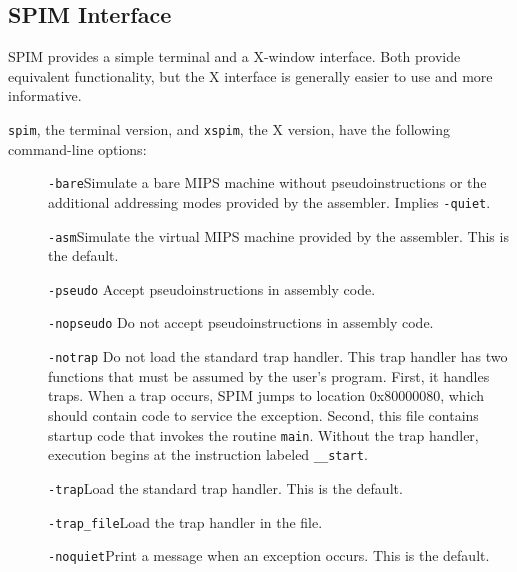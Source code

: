 \subsection{SPIM Interface}

SPIM provides a simple terminal and a X-window interface.  Both
provide equivalent functionality, but the X interface is generally
easier to use and more informative.

{\tt spim}, the terminal version, and {\tt xspim}, the X version, have
the following command-line options:
\begin{description}
  \item [] {\tt -bare}\newline Simulate a bare MIPS machine without
pseudoinstructions or the additional addressing modes provided by the
assembler.  Implies {\tt -quiet}.

  \item [] {\tt -asm}\newline Simulate the virtual MIPS machine
provided by the assembler.  This is the default.

  \item [] {\tt -pseudo} \newline Accept pseudoinstructions in assembly
code. 

  \item [] {\tt -nopseudo} \newline Do not accept pseudoinstructions in
assembly code. 

  \item [] {\tt -notrap} \newline Do not load the standard trap
handler.  This trap handler has two functions that must be assumed by
the user's program.  First, it handles traps.  When a trap occurs,
SPIM jumps to location 0x80000080, which should contain code to
service the exception.  Second, this file contains startup code that
invokes the routine {\tt main}.  Without the trap handler, execution
begins at the instruction labeled {\tt \_\_start}.

  \item [] {\tt -trap}\newline Load the standard trap handler.  This
is the default.

  \item [] {\tt -trap\_file}\newline Load the trap handler in the file.

  \item [] {\tt -noquiet}\newline Print a message when an exception
occurs.  This is the default.


\end{description}
